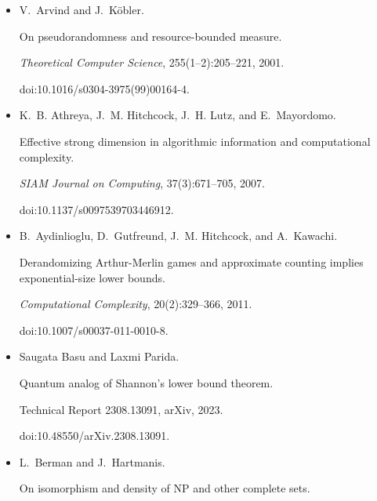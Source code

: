 \begin{itemize}
doi:10.1109/FOCS52979.2021.00062.





\item[] 
[6]

V. Arvind and J. Köbler.


On pseudorandomness and resource-bounded measure.


\emph{Theoretical Computer Science}, 255(1–2):205–221, 2001.


doi:10.1016/s0304-3975(99)00164-4.





\item[] 
[7]

K. B. Athreya, J. M. Hitchcock, J. H. Lutz, and E. Mayordomo.


Effective strong dimension in algorithmic information and
computational complexity.


\emph{SIAM Journal on Computing}, 37(3):671–705, 2007.


doi:10.1137/s0097539703446912.





\item[] 
[8]

B. Aydinlioglu, D. Gutfreund, J. M. Hitchcock, and A. Kawachi.


Derandomizing Arthur-Merlin games and approximate counting implies
exponential-size lower bounds.


\emph{Computational Complexity}, 20(2):329–366, 2011.


doi:10.1007/s00037-011-0010-8.





\item[] 
[9]

Saugata Basu and Laxmi Parida.


Quantum analog of Shannon’s lower bound theorem.


Technical Report 2308.13091, arXiv, 2023.


doi:10.48550/arXiv.2308.13091.





\item[] 
[10]

L. Berman and J. Hartmanis.


On isomorphism and density of NP and other complete sets.



\end{itemize}
